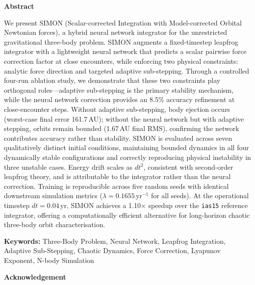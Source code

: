 \documentclass[12pt]{article}
\begin{document}
\vspace{0.5cm}
\noindent\textbf{\large Abstract}
\vspace{0.3cm}

\noindent
We present SIMON (Scalar-corrected Integration with Model-corrected Orbital Newtonian forces),
a hybrid neural network integrator for the unrestricted gravitational three-body problem.
SIMON augments a fixed-timestep leapfrog integrator with a lightweight neural network that
predicts a scalar pairwise force correction factor at close encounters, while enforcing two
physical constraints: analytic force direction and targeted adaptive sub-stepping.
Through a controlled four-run ablation study, we demonstrate that these two constraints play
orthogonal roles---adaptive sub-stepping is the primary stability mechanism, while the neural
network correction provides an 8.5\% accuracy refinement at close-encounter steps.
Without adaptive sub-stepping, body ejection occurs (worst-case final error 161.7\,AU);
without the neural network but with adaptive stepping, orbits remain bounded (1.67\,AU final
RMS), confirming the network contributes accuracy rather than stability.
SIMON is evaluated across seven qualitatively distinct initial conditions, maintaining bounded
dynamics in all four dynamically stable configurations and correctly reproducing physical
instability in three unstable cases.
Energy drift scales as $dt^2$, consistent with second-order leapfrog theory, and is
attributable to the integrator rather than the neural correction.
Training is reproducible across five random seeds with identical downstream simulation
metrics ($\lambda = 0.1655$\,yr$^{-1}$ for all seeds).
At the operational timestep $dt = 0.04$\,yr, SIMON achieves a 1.10$\times$ speedup over
the \texttt{ias15} reference integrator, offering a computationally efficient alternative for
long-horizon chaotic three-body orbit characterisation.

\vspace{0.8cm}
\noindent\textbf{Keywords:} Three-Body Problem, Neural Network, Leapfrog Integration,
Adaptive Sub-Stepping, Chaotic Dynamics, Force Correction, Lyapunov Exponent, N-body Simulation

\newpage
\thispagestyle{empty}

\begin{center}
  {\Large\bfseries Acknowledgement}
\end{center}
\end{document}
